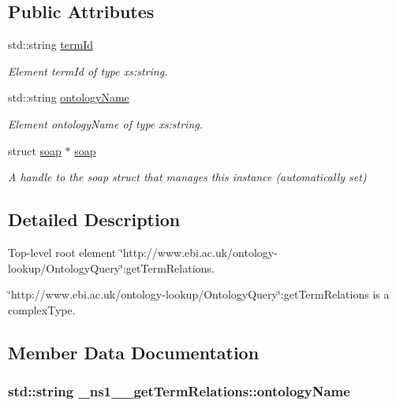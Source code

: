 \subsection*{Public Attributes}
\begin{DoxyCompactItemize}
\item 
std::string \hyperlink{class__ns1____getTermRelations_a0313cc65bb3c46f344b14f0a0604b6c2}{termId}
\begin{DoxyCompactList}\small\item\em Element termId of type xs:string. \end{DoxyCompactList}\item 
std::string \hyperlink{class__ns1____getTermRelations_adef4e60d815dce1337919e6fa19f449d}{ontologyName}
\begin{DoxyCompactList}\small\item\em Element ontologyName of type xs:string. \end{DoxyCompactList}\item 
\hypertarget{class__ns1____getTermRelations_aa508254d24b14c54bb4c6661e381c145}{
struct \hyperlink{class__ns1____getTermRelations_aa508254d24b14c54bb4c6661e381c145}{soap} $\ast$ \hyperlink{class__ns1____getTermRelations_aa508254d24b14c54bb4c6661e381c145}{soap}}
\label{class__ns1____getTermRelations_aa508254d24b14c54bb4c6661e381c145}

\begin{DoxyCompactList}\small\item\em A handle to the soap struct that manages this instance (automatically set) \end{DoxyCompactList}\end{DoxyCompactItemize}


\subsection{Detailed Description}
Top-\/level root element \char`\"{}http://www.ebi.ac.uk/ontology-\/lookup/OntologyQuery\char`\"{}:getTermRelations. 

\char`\"{}http://www.ebi.ac.uk/ontology-\/lookup/OntologyQuery\char`\"{}:getTermRelations is a complexType. 

\subsection{Member Data Documentation}
\hypertarget{class__ns1____getTermRelations_adef4e60d815dce1337919e6fa19f449d}{
\subsubsection[{ontologyName}]{\setlength{\rightskip}{0pt plus 5cm}std::string {\bf \_\-ns1\_\-\_\-getTermRelations::ontologyName}}}
\label{class__ns1____getTermRelations_adef4e60d815dce1337919e6fa19f449d}


